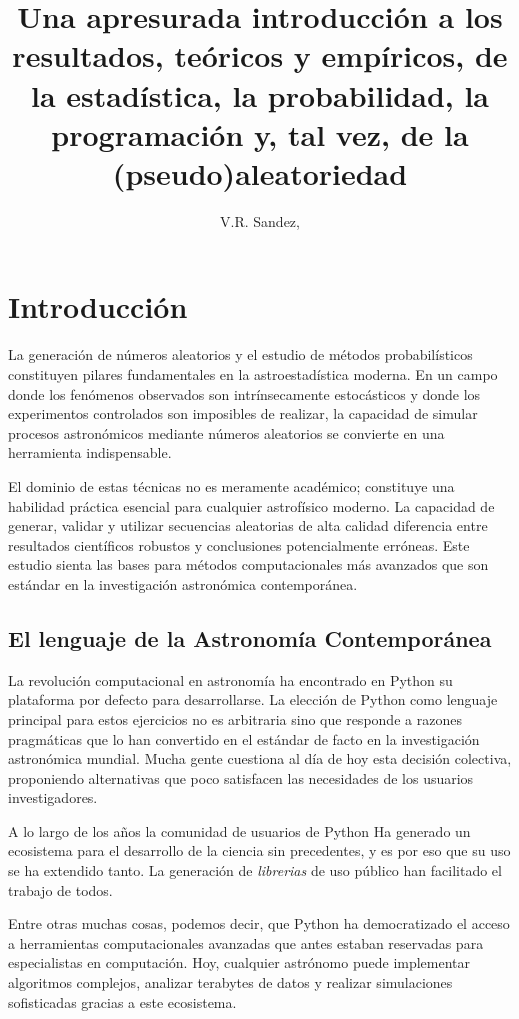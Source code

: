 \documentclass[baaa]{baaa}
\title{Una apresurada introducción a los resultados, teóricos y empíricos, de la estadística, la probabilidad, la programación y, tal vez, de la (pseudo)aleatoriedad}
\author{
V.R. Sandez\inst{1,2},
}
\institute{
Observatorio Astron\'omico de C\'ordoba, UNC, Argentina
\and
Facultad de Matemáticas, Astronomía, Física y Computación, UNC, Argentina
}
\begin{document}
\maketitle

\section{Introducción}\label{S_intro}

La generación de números aleatorios y el estudio de métodos probabilísticos constituyen pilares fundamentales en la astroestadística moderna. En un campo donde los fenómenos observados son intrínsecamente estocásticos y donde los experimentos controlados son imposibles de realizar, la capacidad de simular procesos astronómicos mediante números aleatorios se convierte en una herramienta indispensable.

El dominio de estas técnicas no es meramente académico; constituye una habilidad práctica esencial para cualquier astrofísico moderno. La capacidad de generar, validar y utilizar secuencias aleatorias de alta calidad diferencia entre resultados científicos robustos y conclusiones potencialmente erróneas. Este estudio sienta las bases para métodos computacionales más avanzados que son estándar en la investigación astronómica contemporánea.

\subsection{ El lenguaje de la Astronomía Contemporánea}
La revolución computacional en astronomía ha encontrado en Python su plataforma por defecto para desarrollarse. La elección de Python como lenguaje principal para estos ejercicios no es arbitraria sino que responde a razones pragmáticas que lo han convertido en el estándar de facto en la investigación astronómica mundial. Mucha gente cuestiona al día de hoy esta decisión colectiva, proponiendo alternativas que poco satisfacen las necesidades de los usuarios investigadores.

A lo largo de los años la comunidad de usuarios de Python Ha generado un ecosistema para el desarrollo de la ciencia sin precedentes, y es por eso que su uso se ha extendido tanto. La generación de \textit{librerias} de uso público han facilitado el trabajo de todos.

Entre otras muchas cosas, podemos decir, que Python ha democratizado el acceso a herramientas computacionales avanzadas que antes estaban reservadas para especialistas en computación. Hoy, cualquier astrónomo puede implementar algoritmos complejos, analizar terabytes de datos y realizar simulaciones sofisticadas gracias a este ecosistema.
\end{document}
